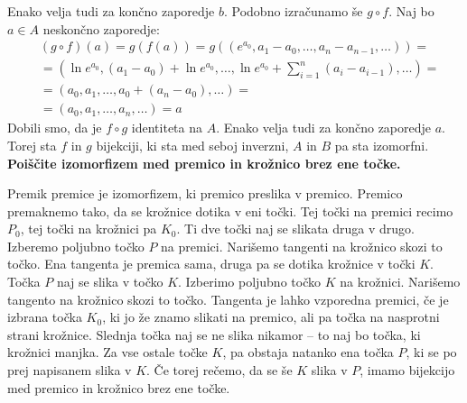 \documentclass[12pt]{article}
\begin{document}
    Enako velja tudi za končno zaporedje \(b\). Podobno izračunamo še \(g \circ f\). Naj bo \(a \in A\) neskončno zaporedje:
    \begin{align*}
        & (g \circ f)(a) = g(f(a)) = g\left(\left(e^{a_0}, a_1 - a_0, \dots, a_n  - a_{n - 1}, \dots\right)\right) = \\
        &= \left(\ln e^{a_0}, \left(a_1 - a_0\right) + \ln e^{a_0}, \dots, \ln e^{a_0} + \sum_{i=1}^{n}\left(a_i - a_{i - 1}\right), \dots\right) = \\
        &= \left(a_0, a_1, \dots, a_0 + (a_n - a_0), \dots\right) = \\
        &= \left(a_0, a_1, \dots, a_n, \dots\right) = a
    \end{align*}
    Dobili smo, da je \(f \circ g\) identiteta na \(A\). Enako velja tudi za končno zaporedje \(a\). Torej sta \(f\) in \(g\) bijekciji, ki sta med seboj inverzni,
    \(A\) in \(B\) pa sta izomorfni. 
    \\

    \textbf{Poiščite izomorfizem med premico in krožnico brez ene točke.}

    \begin{figure*}[h!]
        \centering
    \end{figure*}
    Premik premice je izomorfizem, ki premico preslika v premico. Premico premaknemo tako, da se krožnice dotika v eni točki. Tej točki na premici recimo \(P_0\),
    tej točki na krožnici pa \(K_0\). Ti dve točki naj se slikata druga v drugo. Izberemo poljubno točko \(P\) na premici. Narišemo tangenti na krožnico skozi to točko. Ena tangenta je premica sama, druga pa se dotika
    krožnice v točki \(K\). Točka \(P\) naj se slika v točko \(K\). Izberimo poljubno točko \(K\) na krožnici. Narišemo tangento na krožnico skozi to točko. 
    Tangenta je lahko vzporedna premici, če je izbrana točka \(K_0\), ki jo že znamo slikati na premico, ali pa točka na nasprotni strani krožnice. Slednja točka
    naj se ne slika nikamor -- to naj bo točka, ki krožnici manjka. Za vse ostale točke \(K\), pa obstaja natanko ena točka \(P\), ki se po prej napisanem slika v \(K\).
    Če torej rečemo, da se še \(K\) slika v \(P\), imamo bijekcijo med premico in krožnico brez ene točke.
\end{document}
